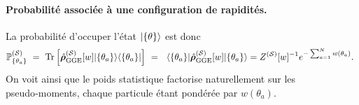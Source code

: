\paragraph{Probabilité associée à une configuration de rapidités.}
La probabilité d’occuper l’état $\ket{\{\theta \}}$ est donc
\begin{eqnarray}
	\mathbb{P}^{(\mathcal{S})}_{\{ \theta_a \}} ~=~ \mathrm{Tr} \left [\operator{\rho}^{(\mathcal{S})}_{\mathrm{GGE}}[w] \vert \{ \theta_a \} \rangle \langle \{ \theta_a \} \vert  \right ] ~= ~ \langle \{ \theta_a \}\vert \operator{\rho}^{(\mathcal{S})}_{\mathrm{GGE}}[w] \vert  \{ \theta_a \} \rangle = Z^{(\mathcal{S})}[w]^{-1}e^{-\sum_{a = 1}^N w(\theta_a)}. 		
\end{eqnarray}
On voit ainsi que le poids statistique factorise naturellement sur les
pseudo‑moments, chaque particule étant pondérée par $w(\theta_a)$.



